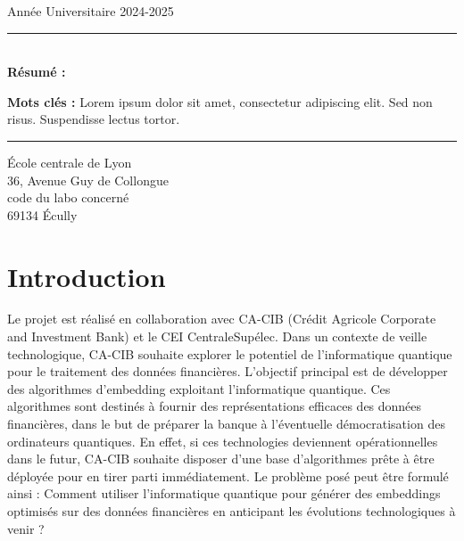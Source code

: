 \documentclass[11pt,a4paper]{article}
\begin{document}
\begin{titlepage}
\begin{center}
\vfill

\begin{center}
    {\large Année Universitaire 2024-2025}
\end{center}

\end{center}
\end{titlepage}

\newpage
\thispagestyle{empty}

\vspace*{\fill}
\noindent\rule[2pt]{\textwidth}{0.5pt}\\
{\textbf{Résumé :}}
\lipsum[1]

{\noindent\textbf{Mots clés :}}
Lorem ipsum dolor sit amet, consectetur adipiscing elit. Sed non risus. Suspendisse lectus tortor.
\\
\noindent\rule[2pt]{\textwidth}{0.5pt}
\begin{center}
  École centrale de Lyon\\
  36, Avenue Guy de Collongue\\
  code du labo concerné\\
  69134 Écully
\end{center}
\vspace*{\fill}

\newpage
\thispagestyle{empty}
\tableofcontents

\newpage
\section{Introduction}
Le projet est réalisé en collaboration avec CA-CIB (Crédit Agricole Corporate and Investment
Bank) et le CEI CentraleSupélec. Dans un contexte de veille technologique, CA-CIB souhaite explorer le potentiel de l’informatique quantique pour le traitement des
données financières.
L’objectif principal est de développer des algorithmes
d’embedding exploitant l’informatique quantique. Ces algorithmes sont destinés à fournir des
représentations efficaces des données financières, dans le but de préparer la banque à l’éventuelle
démocratisation des ordinateurs quantiques. En effet, si ces technologies deviennent opérationnelles
dans le futur, CA-CIB souhaite disposer d’une base d’algorithmes prête à être déployée
pour en tirer parti immédiatement.
Le problème posé peut être formulé ainsi : Comment utiliser l’informatique quantique pour
générer des embeddings optimisés sur des données financières en anticipant les évolutions technologiques
à venir ?
\end{document}

